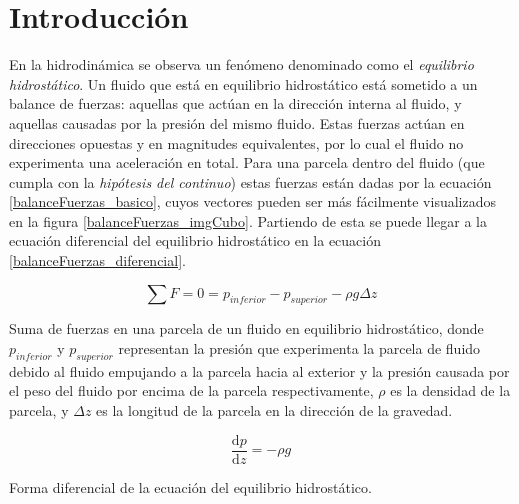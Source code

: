 \section{Introducción}

En la hidrodinámica se observa un fenómeno denominado como el \textit{equilibrio
hidrostático}. Un fluido que está en equilibrio hidrostático está sometido a un
balance de fuerzas: aquellas que actúan en la dirección interna al fluido, y
aquellas causadas por la presión del mismo fluido. Estas fuerzas actúan en
direcciones opuestas y en magnitudes equivalentes, por lo cual el fluido no
experimenta una aceleración en total. Para una parcela dentro del fluido (que
cumpla con la \textit{hipótesis del continuo}) estas fuerzas están dadas por la
ecuación \ref{balanceFuerzas_basico}, cuyos vectores pueden ser más fácilmente
visualizados en la figura \ref{balanceFuerzas_imgCubo}. Partiendo de esta se
puede llegar a la ecuación diferencial del equilibrio hidrostático en la
ecuación \ref{balanceFuerzas_diferencial}.

\begin{equ}[!ht]
	\begin{equation} \label{balanceFuerzas_basico}
		\sum F = 0 = p_{inferior} - p_{superior} -\rho g \Delta z
	\end{equation}
	\caption{Suma de fuerzas en una parcela de un fluido en equilibrio
	hidrostático, donde \(p_{inferior}\) y \(p_{superior}\) representan la
	presión que experimenta la parcela de fluido debido al fluido empujando a la
	parcela hacia al exterior y la presión causada por el peso del fluido por
	encima de la parcela respectivamente, \(\rho\) es la densidad de la parcela,
	y \(\Delta z\) es la longitud de la parcela en la dirección de la gravedad.}
\end{equ}

\begin{equ}[!ht]
	\begin{equation} \label{balanceFuerzas_diferencial}
		\frac{\mathrm{d} p}{\mathrm{d} z} = - \rho g
	\end{equation}
	\caption{Forma diferencial de la ecuación del equilibrio hidrostático.}
\end{equ}

